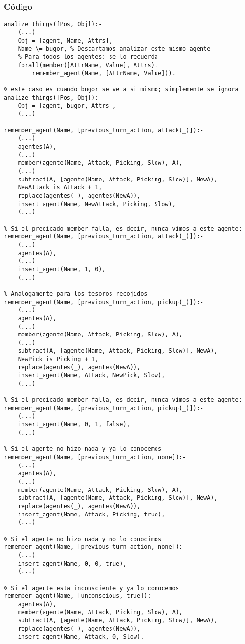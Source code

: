 \documentclass[a4paper,10pt,spanish]{article}
\begin{document}
	\subsubsection{C\'odigo}
	
	\begin{lstlisting}
analize_things([Pos, Obj]):- 
	(...)
	Obj = [agent, Name, Attrs],
	Name \= bugor, % Descartamos analizar este mismo agente
	% Para todos los agentes: se lo recuerda
	forall(member([AttrName, Value], Attrs), 
		remember_agent(Name, [AttrName, Value])).

% este caso es cuando bugor se ve a si mismo; simplemente se ignora
analize_things([Pos, Obj]):- 
	Obj = [agent, bugor, Attrs],
	(...)

remember_agent(Name, [previous_turn_action, attack(_)]):- 
	(...)
	agentes(A),
	(...)
	member(agente(Name, Attack, Picking, Slow), A),
	(...)
	subtract(A, [agente(Name, Attack, Picking, Slow)], NewA),
	NewAttack is Attack + 1,
	replace(agentes(_), agentes(NewA)),
	insert_agent(Name, NewAttack, Picking, Slow),
	(...)

% Si el predicado member falla, es decir, nunca vimos a este agente:
remember_agent(Name, [previous_turn_action, attack(_)]):- 
	(...)
	agentes(A),
	(...)
	insert_agent(Name, 1, 0),
	(...)

% Analogamente para los tesoros recojidos
remember_agent(Name, [previous_turn_action, pickup(_)]):- 
	(...)
	agentes(A),
	(...)
	member(agente(Name, Attack, Picking, Slow), A),
	(...)
	subtract(A, [agente(Name, Attack, Picking, Slow)], NewA),
	NewPick is Picking + 1,
	replace(agentes(_), agentes(NewA)),
	insert_agent(Name, Attack, NewPick, Slow),
	(...)

% Si el predicado member falla, es decir, nunca vimos a este agente:
remember_agent(Name, [previous_turn_action, pickup(_)]):- 
	(...)
	insert_agent(Name, 0, 1, false),
	(...)

% Si el agente no hizo nada y ya lo conocemos
remember_agent(Name, [previous_turn_action, none]):- 
	(...)
	agentes(A),
	(...)
	member(agente(Name, Attack, Picking, Slow), A),
	subtract(A, [agente(Name, Attack, Picking, Slow)], NewA),
	replace(agentes(_), agentes(NewA)),
	insert_agent(Name, Attack, Picking, true),
	(...)

% Si el agente no hizo nada y no lo conocimos
remember_agent(Name, [previous_turn_action, none]):- 
	(...)
	insert_agent(Name, 0, 0, true),
	(...)
	
% Si el agente esta inconsciente y ya lo conocemos
remember_agent(Name, [unconscious, true]):-
	agentes(A),
	member(agente(Name, Attack, Picking, Slow), A),
	subtract(A, [agente(Name, Attack, Picking, Slow)], NewA),
	replace(agentes(_), agentes(NewA)),
	insert_agent(Name, Attack, 0, Slow).


\end{lstlisting}
\end{document}
